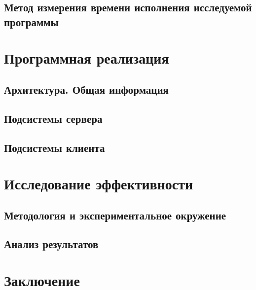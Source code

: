 \documentclass{disser}
\begin{document}
\subsection{Метод измерения времени исполнения исследуемой программы}

\section{Программная реализация}
\subsection{Архитектура. Общая информация}

\subsection{Подсистемы сервера}

\subsection{Подсистемы клиента}

\section{Исследование эффективности}
\subsection{Методология и экспериментальное окружение}

\subsection{Анализ результатов}

\section*{Заключение}
\end{document}
